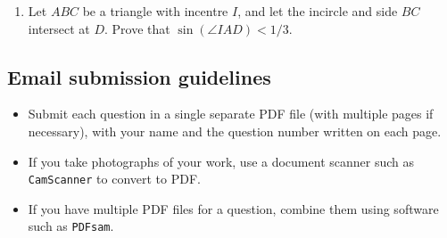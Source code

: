 \documentclass[12pt]{article}
\begin{document}
\begin{enumerate}
\item %
Let $ABC$ be a triangle with incentre $I$, and let the incircle and side $BC$ intersect at $D$. Prove that $\sin(\angle IAD) < 1/3$.

\end{enumerate}


\small
\subsection*{Email submission guidelines}

\begin{itemize}
\item Submit each question in a single separate PDF file (with multiple pages if necessary), with your name and the question number written on each page.
\item If you take photographs of your work, use a document scanner such as \verb!CamScanner! to convert to PDF.
\item If you have multiple PDF files for a question, combine them using software such as \verb!PDFsam!.
\end{itemize}
\end{document}
